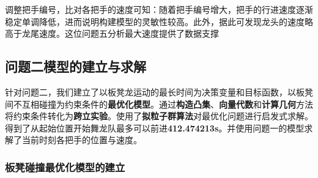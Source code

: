 \documentclass[a4paper]{article}
\begin{document}
		调整把手编号，比对各把手的速度可知：随着把手编号增大，把手的行进速度逐渐稳定单调降低，进而说明构建模型的灵敏性较高。此外，据此可发现龙头的速度略高于龙尾速度。这位问题五分析最大速度提供了数据支撑

	\subsection{问题二模型的建立与求解}
	     针对问题二，我们建立了以板凳龙运动的最长时间为决策变量和目标函数，以板凳间不互相碰撞为约束条件的\textbf{最优化模型}。通过\textbf{构造凸集}、\textbf{向量代数}和\textbf{计算几何}方法将约束条件转化为\textbf{跨立实验}。使用了\textbf{拟粒子群算法}对最优化问题进行启发式求解。得到了从起始位置开始舞龙队最多可以前进\textbf{412.474213s}。并使用问题一的模型求解了当前时刻各把手的位置与速度。

        \subsubsection{板凳碰撞最优化模型的建立}
\end{document}
